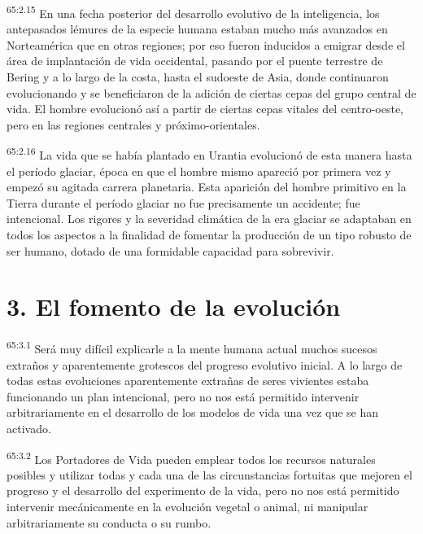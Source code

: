 \par
\textsuperscript{65:2.15} En una fecha posterior del desarrollo evolutivo de la inteligencia, los antepasados lémures de la especie humana estaban mucho más avanzados en Norteamérica que en otras regiones; por eso fueron inducidos a emigrar desde el área de implantación de vida occidental, pasando por el puente terrestre de Bering y a lo largo de la costa, hasta el sudoeste de Asia, donde continuaron evolucionando y se beneficiaron de la adición de ciertas cepas del grupo central de vida. El hombre evolucionó así a partir de ciertas cepas vitales del centro-oeste, pero en las regiones centrales y próximo-orientales.

\par
\textsuperscript{65:2.16} La vida que se había plantado en Urantia evolucionó de esta manera hasta el período glaciar, época en que el hombre mismo apareció por primera vez y empezó su agitada carrera planetaria. Esta aparición del hombre primitivo en la Tierra durante el período glaciar no fue precisamente un accidente; fue intencional. Los rigores y la severidad climática de la era glaciar se adaptaban en todos los aspectos a la finalidad de fomentar la producción de un tipo robusto de ser humano, dotado de una formidable capacidad para sobrevivir.

\section*{3. El fomento de la evolución}
\par
\textsuperscript{65:3.1} Será muy difícil explicarle a la mente humana actual muchos sucesos extraños y aparentemente grotescos del progreso evolutivo inicial. A lo largo de todas estas evoluciones aparentemente extrañas de seres vivientes estaba funcionando un plan intencional, pero no nos está permitido intervenir arbitrariamente en el desarrollo de los modelos de vida una vez que se han activado.

\par
\textsuperscript{65:3.2} Los Portadores de Vida pueden emplear todos los recursos naturales posibles y utilizar todas y cada una de las circunstancias fortuitas que mejoren el progreso y el desarrollo del experimento de la vida, pero no nos está permitido intervenir mecánicamente en la evolución vegetal o animal, ni manipular arbitrariamente su conducta o su rumbo.

